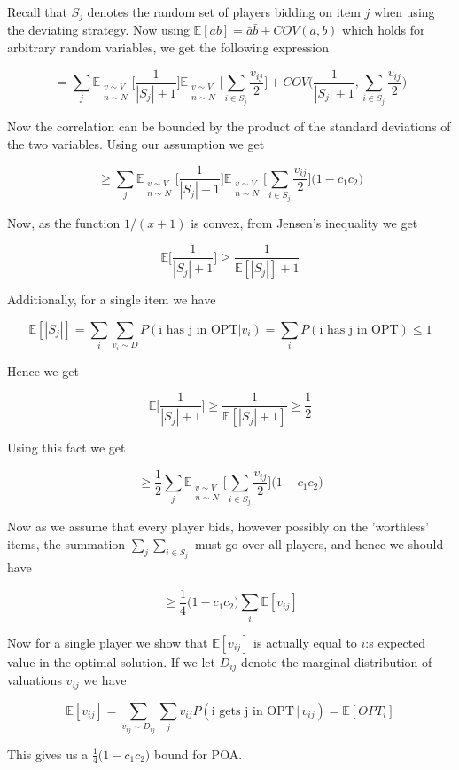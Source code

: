 Recall that $S_j$ denotes the random set of players bidding on item $j$ when using the deviating strategy. Now using $\mathbb{E}[ab] = \bar{a} \bar{b} + COV(a,b)$ which holds for arbitrary random variables, we get the following expression

$$
= \sum_j \mathbb{E}_{ \substack{ v \sim V \\ n \sim N }} \bigg[ \frac{1}{|S_j|+1}   \bigg]  \mathbb{E}_{ \substack{ v \sim V \\ n \sim N }} \bigg[  \sum_{i \in S_j} \frac{v_{ij}}{2} \bigg]  + COV \bigg(\frac{1}{|S_j|+1}, \sum_{i \in S_j} \frac{v_{ij}}{2} \bigg)
$$


Now the correlation can be bounded by the product of the standard deviations of the two variables. Using our assumption we get

$$
\ge \sum_j \mathbb{E}_{ \substack{ v \sim V \\ n \sim N }} \bigg[ \frac{1}{|S_j|+1}   \bigg]  \mathbb{E}_{ \substack{ v \sim V \\ n \sim N }} \bigg[  \sum_{i \in S_j} \frac{v_{ij}}{2} \bigg] \bigg(1  - c_1 c_2 \bigg)
$$

Now, as the function $1/(x+1)$ is convex, from Jensen's inequality we get

$$
\mathbb{E} \bigg[ \frac{1}{|S_j|+1} \bigg] \ge \frac{1}{\mathbb{E} [|S_j|]+1} 
$$


Additionally, for a single item we have

$$
\mathbb{E} [|S_j|] = \sum_i \sum_{v_i \sim D} P(\textrm{i has j in OPT} | v_i) = \sum_i P(\textrm{i has j in OPT} ) \le 1
$$

Hence we get

$$
\mathbb{E} \bigg[ \frac{1}{|S_j|+1} \bigg] \ge \frac{1}{\mathbb{E} [|S_j|+1]} \ge \frac{1}{2}
$$


Using this fact we get

$$
\ge \frac{1}{2} \sum_j \mathbb{E}_{ \substack{ v \sim V \\ n \sim N }} \bigg[  \sum_{i \in S_j} \frac{v_{ij}}{2} \bigg] \bigg(1  - c_1 c_2 \bigg)
$$

Now as we assume that every player bids, however possibly on the 'worthless' items, the summation $\sum_j \sum_{i \in S_j}$ must go over all players, and hence we should have

$$
\ge \frac{1}{4} \bigg(1  - c_1 c_2 \bigg)  \sum_i\mathbb{E} [ v_{ij}]
$$

Now for a single player we show that $\mathbb{E} [ v_{ij}]$ is actually equal to $i$:s expected value in the optimal solution. If we let $D_{ij}$ denote the marginal distribution of valuations $v_{ij}$ we have

$$
\mathbb{E} [ v_{ij}] = \sum_{v_{ij} \sim D_{ij}} \sum_j v_{ij} P( \textrm{i gets j in OPT} \,  | \, v_{ij}) = \mathbb{E} [OPT_i]
$$

This gives us a $\frac{1}{4} \big(1  - c_1 c_2 \big) $ bound for POA.
